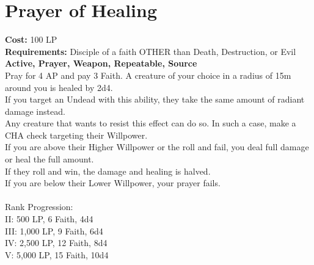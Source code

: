 \section{Prayer of Healing}\label{prayer:healing}
\textbf{Cost:} 100 LP\\
\textbf{Requirements:} Disciple of a faith OTHER than Death, Destruction, or Evil\\
\textbf{Active, Prayer, Weapon, Repeatable, Source}\\
Pray for 4 AP and pay 3 Faith.
A creature of your choice in a radius of 15m around you is healed by 2d4.\\
If you target an Undead with this ability, they take the same amount of radiant damage instead.\\
Any creature that wants to resist this effect can do so.
In such a case, make a CHA check targeting their Willpower.\\
If you are above their Higher Willpower or the roll and fail, you deal full damage or heal the full amount.\\
If they roll and win, the damage and healing is halved.\\
If you are below their Lower Willpower, your prayer fails.\\
\\
Rank Progression:\\
II: 500 LP, 6 Faith, 4d4\\
III: 1,000 LP, 9 Faith, 6d4\\
IV: 2,500 LP, 12 Faith, 8d4\\
V: 5,000 LP, 15 Faith, 10d4\\